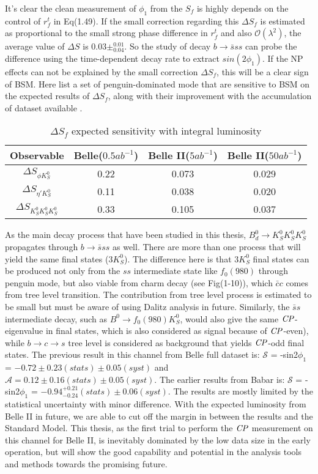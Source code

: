 It's clear the clean measurement of $\phi_1$ from the $S_f$ is highly depends on the control of $r^t_f$ in Eq(1.49). If the small correction regarding this $\Delta S_f$ is estimated as proportional to the small strong phase difference in $r^t_f$ and also $\mathcal{O}(\lambda^2)$, the average value of $\Delta S$ is $0.03 \pm ^{0.01}_{0.04}$\cite{Abe:2010gxa}. So the study of decay $b\to \bar{s}ss$ can probe the difference using the time-dependent decay rate to extract $sin(2\phi_1)$. If the NP effects can not be explained by the small correction $\Delta S_f$, this will be a clear sign of BSM. Here list a set of penguin-dominated mode that are sensitive to BSM on the expected results of $\Delta S_f$, along with their improvement with the accumulation of dataset available \cite{Abe:2010gxa}.
\begin{table}[H]
	\centering
	\large
	\caption{$\Delta S_f$ expected sensitivity with integral luminosity}
	\begin{tabular}{c c c c}
		\toprule
		Observable & Belle($0.5ab^{-1}$) & Belle II($5ab^{-1}$)& Belle II($50ab^{-1}$)\\
		\hline
		$\Delta S_{\phi K^0_S}$ & 0.22 &  0.073 & 0.029\\
		$\Delta S_{\eta' K^0_S}$   & 0.11 &  0.038 & 0.020\\
		$\Delta S_{ K^0_S K^0_S K^0_S}$ & 0.33 & 0.105 & 0.037\\
		\bottomrule
	\end{tabular}
\end{table}
As the main decay process that have been studied in this thesis, $B^0_d\to K^0_S K^0_S K^0_S$ propagates through $b\to \bar{s}ss$ as well. There are more than one process that will yield the same final states ($3K_S^0$). The difference here is that $3K_S^0$ final states can be produced not only from the $ss$ intermediate state like $f_0(980)$ through penguin mode, but also viable from charm decay (see Fig(1-10)), which $\bar{c}c$ comes from tree level transition. The contribution from tree level process is estimated to be small but must be aware of using Dalitz analysis in future. Similarly, the $\bar{s}s$ intermediate decay, such as $B^0 \to f_0(980)K^0_S$, would also give the same $\it{CP}$-eigenvalue in final states, which is also considered as signal because of $\it{CP}$-even), while $b\to c\to s$ tree level is considered as background that yields $\it{CP}$-odd final states. The previous result in this channel from Belle full dataset \cite{kang2020measurement} is:  $\mathcal{S}$ = -sin2$\phi_1$ = $-0.72\pm 0.23(stats)\pm 0.05(syst)$ and $\mathcal{A}=0.12\pm0.16(stats)\pm 0.05(syst)$. The earlier results from Babar\cite{lees2012amplitude} is: $\mathcal{S}$ = -sin2$\phi_1$ = $-0.94^{+0.21}_{-0.24}(stats)\pm 0.06(syst)$. The results are mostly limited by the statistical uncertainty with minor difference. With the expected luminosity from Belle II in future, we are able to cut off the margin in between the results and the Standard Model. This thesis, as the first trial to perform the $\it{CP}$ measurement on this channel for Belle II, is inevitably dominated by the low data size in the early operation, but will show the good capability and potential in the analysis tools and methods towards the promising future.

